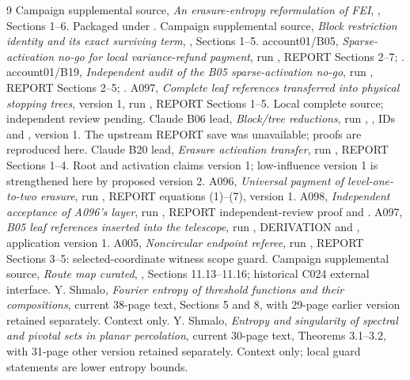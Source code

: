\documentclass[11pt]{article}
\begin{document}
\begin{thebibliography}{9}
 Campaign supplemental source,
\emph{An erasure-entropy reformulation of FEI},
, Sections 1--6.
Packaged under .
 Campaign supplemental source,
\emph{Block restriction identity and its exact surviving term},
, Sections 1--5.
 account01/B05,
\emph{Sparse-activation no-go for local variance-refund payment},
run ,
REPORT Sections 2--7;
.
 account01/B19,
\emph{Independent audit of the B05 sparse-activation no-go},
run ,
REPORT Sections 2--5;
.
 A097, \emph{Complete leaf references transferred into physical
stopping trees}, version 1,
run ,
REPORT Sections 1--5. Local complete source; independent review pending.
 Claude B06 lead, \emph{Block/tree reductions},
run ,
, IDs  and
, version 1.
The upstream REPORT save was unavailable; proofs are reproduced here.
 Claude B20 lead, \emph{Erasure activation transfer},
run ,
REPORT Sections 1--4. Root and activation claims version 1;
low-influence version 1 is strengthened here by proposed version 2.
 A096, \emph{Universal payment of level-one-to-two erasure},
run ,
REPORT equations (1)--(7), version 1.
 A098, \emph{Independent acceptance of A096's layer},
run ,
REPORT independent-review proof and .
 A097, \emph{B05 leaf references inserted into the telescope},
run ,
DERIVATION and , application version 1.
 A005, \emph{Noncircular endpoint referee},
run ,
REPORT Sections 3--5: selected-coordinate witness scope guard.
 Campaign supplemental source,
\emph{Route map curated}, ,
Sections 11.13--11.16; historical C024 external interface.
 Y. Shmalo, \emph{Fourier entropy of threshold functions and
their compositions}, current 38-page text, Sections 5 and 8,
with 29-page earlier version retained separately. Context only.
 Y. Shmalo, \emph{Entropy and singularity of spectral and
pivotal sets in planar percolation}, current 30-page text,
Theorems 3.1--3.2, with 31-page other version retained separately.
Context only; local guard statements are lower entropy bounds.


\end{thebibliography}
\end{document}
